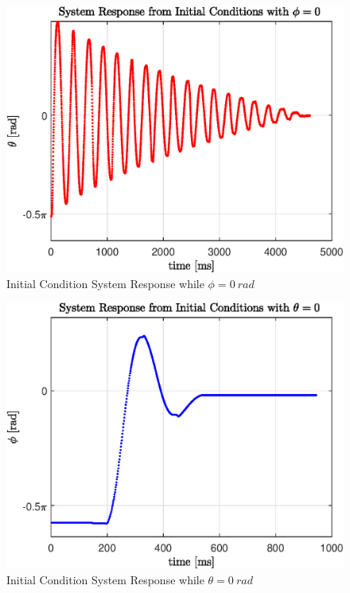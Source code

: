 \documentclass[a4paper,12pt]{article}
\begin{document}
	\begin{figure}[h]
		\centering
		\includegraphics[scale=1]{q1_initial_response.eps}
		\caption{Initial Condition System Response while $ \phi = \SI{0}{rad} $ }
		\label{fig:q1_response}
	\end{figure}
		
	
	\begin{figure}[h]
		\centering
		\includegraphics[scale=1]{q2_initial_response.eps}
		\caption{Initial Condition System Response while $ \theta = \SI{0}{rad} $ }
		\label{fig:q2_response}
	\end{figure}
\end{document}
